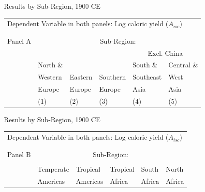 \documentclass[10pt, xcolor=dvipsnames]{beamer}
\begin{document}
\begin{frame}{Results by Sub-Region, 1900 CE}

{\scriptsize
\begin{tabularx}{\textwidth}{lXXXXX}
\midrule
\multicolumn{6}{l}{Dependent Variable in both panels: Log caloric yield ($A_{isc}$)} \\ \\
\\
Panel A & \multicolumn{5}{c}{Sub-Region:} \\ \cmidrule{2-6}
 &          &         &             &  \multicolumn{2}{c}{Excl. China} \\ \cmidrule(lr){5-6}
 & North \& &         &              & South \&  & Central \&             \\
 & Western  & Eastern & Southern     & Southeast & West        \\
 & Europe   & Europe  & Europe       & Asia      & Asia      \\
 & (1) & (2) & (3) & (4) & (5) \\
\midrule

\midrule
\end{tabularx}
}

\hfill \hyperlink{robustness}{}
\end{frame}

\begin{frame}{Results by Sub-Region, 1900 CE}

{\scriptsize
\begin{tabularx}{\textwidth}{lXXXXX}
\midrule
\multicolumn{6}{l}{Dependent Variable in both panels: Log caloric yield ($A_{isc}$)} \\ \\
\\
Panel B & \multicolumn{5}{c}{Sub-Region:} \\ \cmidrule{2-6}
 &           &   &           &          &             \\
 & Temperate & Tropical  & Tropical & South    & North    \\
 & Americas  & Americas  & Africa   & Africa   & Africa     \\
\midrule

\midrule
\end{tabularx}
}

\hfill \hyperlink{robustness}{}
\end{frame}
\end{document}
